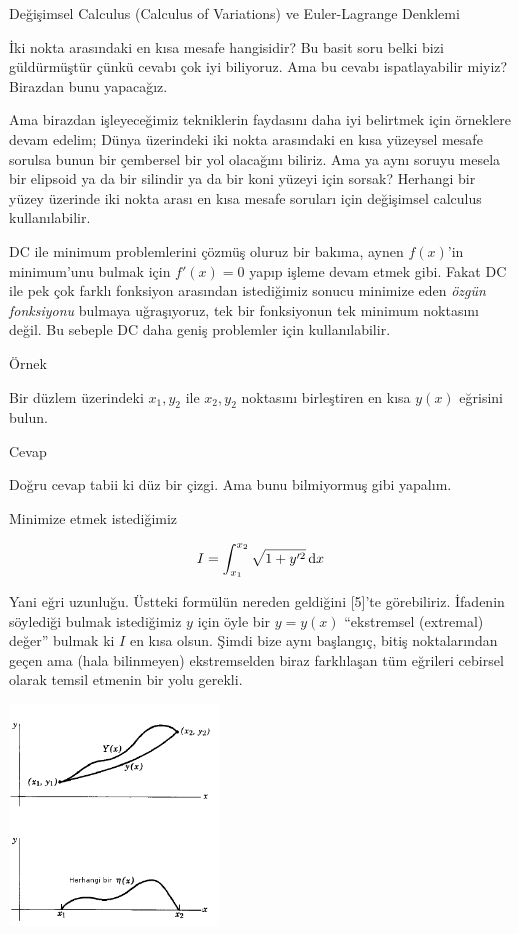 \documentclass[12pt,fleqn]{article}\usepackage{../../common}
\begin{document}
Değişimsel Calculus (Calculus of Variations) ve Euler-Lagrange Denklemi

İki nokta arasındaki en kısa mesafe hangisidir? Bu basit soru belki bizi
güldürmüştür çünkü cevabı çok iyi biliyoruz. Ama bu cevabı ispatlayabilir
miyiz? Birazdan bunu yapacağız. 

Ama birazdan işleyeceğimiz tekniklerin faydasını daha iyi belirtmek için
örneklere devam edelim; Dünya üzerindeki iki nokta arasındaki en kısa
yüzeysel mesafe sorulsa bunun bir çembersel bir yol olacağını biliriz. Ama
ya aynı soruyu mesela bir elipsoid ya da bir silindir ya da bir koni yüzeyi
için sorsak? Herhangi bir yüzey üzerinde iki nokta arası en kısa mesafe
soruları için değişimsel calculus kullanılabilir.

DC ile  minimum problemlerini çözmüş oluruz bir bakıma, aynen $f(x)$'in
minimum'unu bulmak için $f'(x) = 0$ yapıp işleme devam etmek gibi. Fakat DC
ile pek çok farklı fonksiyon arasından istediğimiz sonucu minimize eden
{\em özgün fonksiyonu} bulmaya uğraşıyoruz, tek bir fonksiyonun tek minimum
noktasını değil. Bu sebeple DC daha geniş problemler için kullanılabilir.

Örnek

Bir düzlem üzerindeki $x_1,y_2$ ile $x_2,y_2$ noktasını birleştiren en kısa
$y(x)$ eğrisini bulun.

Cevap

Doğru cevap tabii ki düz bir çizgi. Ama bunu bilmiyormuş gibi yapalım. 

Minimize etmek istediğimiz 

$$
I = \int_{x_1}^{x_2} \sqrt{ 1 + y'^2} \,\mathrm{d} x
$$

Yani eğri uzunluğu. Üstteki formülün nereden geldiğini [5]'te
görebiliriz. İfadenin söylediği bulmak istediğimiz $y$ için öyle bir
$y = y(x)$ ``ekstremsel (extremal) değer'' bulmak ki $I$ en kısa
olsun. Şimdi bize aynı başlangıç, bitiş noktalarından geçen ama (hala
bilinmeyen) ekstremselden biraz farklılaşan tüm eğrileri cebirsel olarak
temsil etmenin bir yolu gerekli.

\includegraphics[width=15em]{phy_varcalc_01.png}
\end{document}
